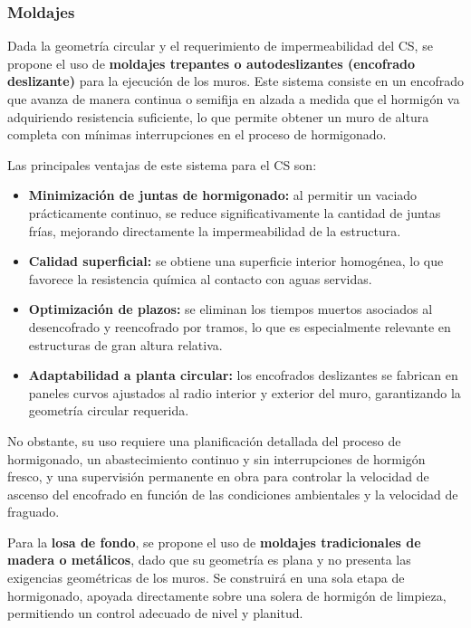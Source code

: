 \subsubsection{Moldajes}

Dada la geometría circular y el requerimiento de impermeabilidad del CS, se propone el uso de \textbf{moldajes trepantes o autodeslizantes (encofrado deslizante)} para la ejecución de los muros. Este sistema consiste en un encofrado que avanza de manera continua o semifija en alzada a medida que el hormigón va adquiriendo resistencia suficiente, lo que permite obtener un muro de altura completa con mínimas interrupciones en el proceso de hormigonado.

Las principales ventajas de este sistema para el CS son:

\begin{itemize}
    \item \textbf{Minimización de juntas de hormigonado:} al permitir un vaciado prácticamente continuo, se reduce significativamente la cantidad de juntas frías, mejorando directamente la impermeabilidad de la estructura.
    \item \textbf{Calidad superficial:} se obtiene una superficie interior homogénea, lo que favorece la resistencia química al contacto con aguas servidas.
    \item \textbf{Optimización de plazos:} se eliminan los tiempos muertos asociados al desencofrado y reencofrado por tramos, lo que es especialmente relevante en estructuras de gran altura relativa.
    \item \textbf{Adaptabilidad a planta circular:} los encofrados deslizantes se fabrican en paneles curvos ajustados al radio interior y exterior del muro, garantizando la geometría circular requerida.
\end{itemize}

No obstante, su uso requiere una planificación detallada del proceso de hormigonado, un abastecimiento continuo y sin interrupciones de hormigón fresco, y una supervisión permanente en obra para controlar la velocidad de ascenso del encofrado en función de las condiciones ambientales y la velocidad de fraguado.

Para la \textbf{losa de fondo}, se propone el uso de \textbf{moldajes tradicionales de madera o metálicos}, dado que su geometría es plana y no presenta las exigencias geométricas de los muros. Se construirá en una sola etapa de hormigonado, apoyada directamente sobre una solera de hormigón de limpieza, permitiendo un control adecuado de nivel y planitud.

